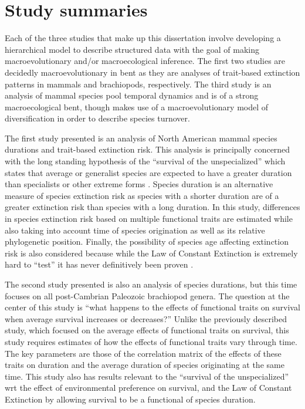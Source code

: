 \section{Study summaries}  %

Each of the three studies that make up this dissertation involve developing a hierarchical model to describe structured data with the goal of making macroevolutionary and/or macroecological inference. The first two studies are decidedly macroevolutionary in bent as they are analyses of trait-based extinction patterns in mammals and brachiopods, respectively. The third study is an analysis of mammal species pool temporal dynamics and is of a strong macroecological bent, though makes use of a macroevolutionary model of diversification in order to describe species turnover.

The first study presented is an analysis of North American mammal species durations and trait-based extinction risk. This analysis is principally concerned with the long standing hypothesis of the ``survival of the unspecialized'' which states that average or generalist species are expected to have a greater duration than specialists or other extreme forms \citep{Simpson1944,Liow2004a,Liow2007b}. Species duration is an alternative measure of species extinction risk as species with a shorter duration are of a greater extinction risk than species with a long duration. In this study, differences in species extinction risk based on multiple functional traits are estimated while also taking into account time of species origination as well as its relative phylogenetic position. Finally, the possibility of species age affecting extinction risk is also considered because while the Law of Constant Extinction is extremely hard to ``test'' it has never definitively been proven \citep{VanValen1973,Liow2011a}.


The second study presented is also an analysis of species durations, but this time focuses on all post-Cambrian Paleozoic brachiopod genera. The question at the center of this study is ``what happens to the effects of functional traits on survival when average survival increases or decreases?'' Unlike the previously described study, which focused on the average effects of functional traits on survival, this study requires estimates of how the effects of functional traits vary through time. The key parameters are those of the correlation matrix of the effects of these traits on duration and the average duration of species originating at the same time. This study also has results relevant to the ``survival of the unspecialized'' wrt the effect of environmental preference on survival, and the Law of Constant Extinction by allowing survival to be a functional of species duration.

